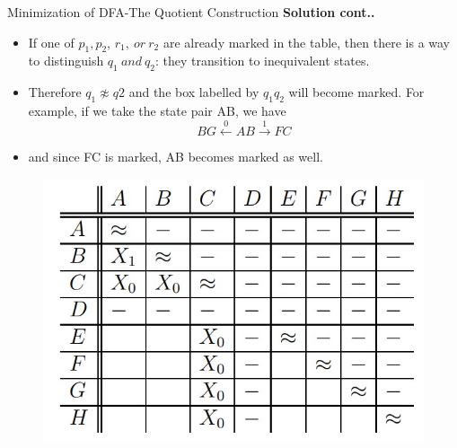\documentclass{beamer}
\begin{document}
\begin{frame}{Minimization of DFA-The Quotient Construction}
	\textbf{Solution cont..}
	\begin{itemize}
		\item If one of $p_1, p_2$,
		$r_1,\  or\  r_2$ are already marked in the table, then there is a way to distinguish
		$q_1 \ and\  q_2$: they transition to inequivalent states.
		\item Therefore $q_1 \not\approx  q2$ and the
		box labelled by $q_1q_2$ will become marked. For example, if we take the state
		pair AB, we have
		$$BG \xleftarrow{0} AB \xrightarrow{1} FC$$
	\end{itemize}
	\begin{itemize}
		\item and since FC is marked, AB becomes marked as well.
	\end{itemize}
	\begin{figure}
	\includegraphics[scale=.4]{img2/m16}
\end{figure}
\end{frame}
\end{document}
